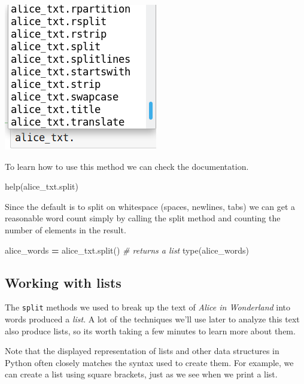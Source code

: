 \documentclass[
]{book}
\newenvironment{Shaded}{\begin{snugshade}}{\end{snugshade}}
\newcommand{\BuiltInTok}[1]{#1}
\newcommand{\CommentTok}[1]{\textcolor[rgb]{0.56,0.35,0.01}{\textit{#1}}}
\newcommand{\NormalTok}[1]{#1}
\newcommand{\OperatorTok}[1]{\textcolor[rgb]{0.81,0.36,0.00}{\textbf{#1}}}
\begin{document}
\includegraphics{Python/PythonIntro/images/notebook_string_completion.png}

To learn how to use this method we can check the documentation.

\begin{Shaded}
\begin{Highlighting}[]
\BuiltInTok{help}\NormalTok{(alice_txt.split)}
\end{Highlighting}
\end{Shaded}

Since the default is to split on whitespace (spaces, newlines, tabs) we can get a reasonable word count simply by calling the split method and counting the number of elements in the result.

\begin{Shaded}
\begin{Highlighting}[]
\NormalTok{alice_words }\OperatorTok{=}\NormalTok{ alice_txt.split() }\CommentTok{# returns a list}
\BuiltInTok{type}\NormalTok{(alice_words)}
\end{Highlighting}
\end{Shaded}

\hypertarget{working-with-lists}{%
\subsection{Working with lists}\label{working-with-lists}}

The \texttt{split} methods we used to break up the text of \emph{Alice in Wonderland} into words produced a \emph{list}. A lot of the techniques we'll use later to analyze this text also produce lists, so its worth taking a few minutes to learn more about them.

Note that the displayed representation of lists and other data structures in Python often closely matches the syntax used to create them. For example, we can create a list using square brackets, just as we see when we print a list.
\end{document}
